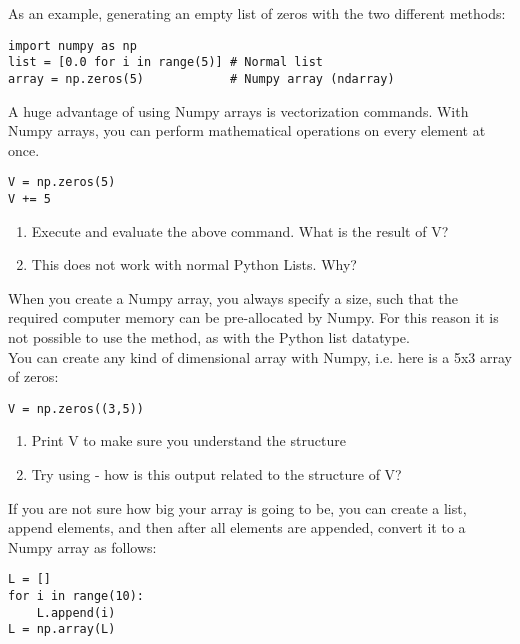 \documentclass{article}
\begin{document}
As an example, generating an empty list of zeros with the two different methods:
\begin{lstlisting}
import numpy as np
list = [0.0 for i in range(5)] # Normal list
array = np.zeros(5)            # Numpy array (ndarray)
\end{lstlisting}

A huge advantage of using Numpy arrays is vectorization commands.
With Numpy arrays, you can perform mathematical operations on every element at once.
\begin{lstlisting}
V = np.zeros(5)
V += 5
\end{lstlisting}

\begin{enumerate}
    \item Execute and evaluate the above command.
        What is the result of V?
    \item This does not work with normal Python Lists. Why? 
\end{enumerate}

When you create a Numpy array, you always specify a size, such that the required computer memory can be pre-allocated by Numpy.
For this reason it is not possible to use the  method, as with the Python list datatype.\\

You can create any kind of dimensional array with Numpy, i.e. here is a 5x3 array of zeros:

\begin{lstlisting}
V = np.zeros((3,5))
\end{lstlisting}

\begin{enumerate}[resume]
    \item Print V to make sure you understand the structure
    \item Try using  - how is this output related to the structure of V?
\end{enumerate}

If you are not sure how big your array is going to be, you can create a list, append elements,
and then after all elements are appended, convert it to a Numpy array as follows:

\begin{lstlisting}
L = []
for i in range(10):
    L.append(i)
L = np.array(L)
\end{lstlisting}

%
%
%
\end{document}
